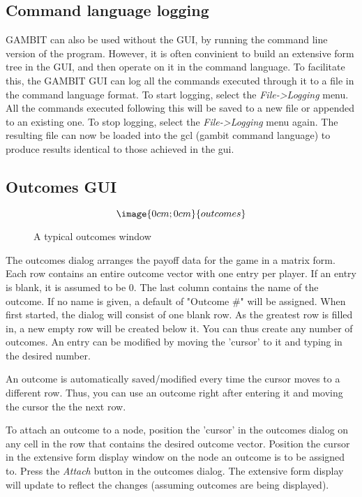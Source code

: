 \subsection{Command language logging}
GAMBIT can also be used without the GUI, by running the command line
version of the program.  However, it is often convinient to build an
extensive form tree in the GUI, and then operate on it in the command
language.  To facilitate this, the GAMBIT GUI can log all the commands
executed through it to a file in the command language format.  To start
logging, select the {\em File->Logging} menu.  All the commands executed
following this will be saved to a new file or appended to an existing one.
To stop logging, select the {\em File->Logging} menu again.  The resulting
file can now be loaded into the gcl (gambit command language) to produce
results identical to those achieved in the gui.


\subsection{Outcomes GUI}\label{OutcomesGUI}
\begin{figure}
$$\image{0cm;0cm}{outcomes}$$
\caption{A typical outcomes window}\label{fig_outcomes}
\end{figure}

The outcomes dialog arranges the payoff data for the game in a matrix
form.  Each row contains an entire outcome vector with one entry per
player.  If an entry is blank, it is assumed to be 0.  The last column
contains the name of the outcome.  If no name is given, a default of
"Outcome \#" will be assigned.  When first started, the dialog will consist
of one blank row.  As the greatest row is filled in, a new empty row will
be created below it.  You can thus create any number of outcomes.  An
entry can be modified by moving the 'cursor' to it and typing in the
desired number.

An outcome is automatically saved/modified every time the cursor moves to
a different row.  Thus, you can use an outcome right after entering it and
moving the cursor the the next row.

To attach an outcome to a node, position the 'cursor' in the outcomes
dialog on any cell in the row that contains the desired outcome vector.
Position the cursor in the extensive form display window on the node an
outcome is to be assigned to.  Press the {\em Attach} button in the
outcomes dialog.  The extensive form display will update to reflect the
changes (assuming outcomes are being displayed).

